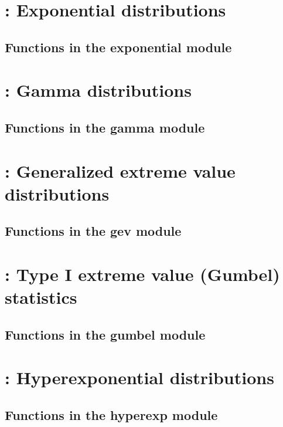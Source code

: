 \documentclass[10pt]{book}
\begin{document}
\newpage
\section{: Exponential distributions}

\subsection{Functions in the exponential module}


\newpage
\section{: Gamma distributions}

\subsection{Functions in the gamma module}


\newpage
\section{: Generalized extreme value distributions}

\subsection{Functions in the gev module}


\newpage
\section{: Type I extreme value (Gumbel) statistics}

\subsection{Functions in the gumbel module}


\newpage
\section{: Hyperexponential distributions}

\subsection{Functions in the hyperexp module}

\end{document}

